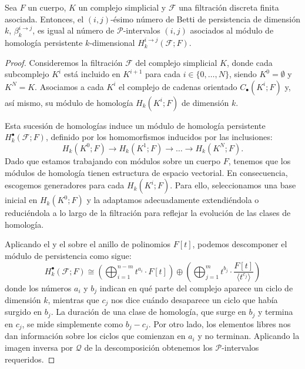 \begin{corolario}
	Sea $F$ un cuerpo, $K$ un complejo simplicial y $\mathcal{F}$ una filtración discreta finita asociada. Entonces, el $(i,j)$-ésimo número de Betti de persistencia de dimensión $k$, \(\beta_k^{i \to j}\), es igual al número de $\mathcal{P}$-intervalos $(i,j)$ asociados al módulo de homología persistente $k$-dimensional  \(H_k^{i \to j}(\mathcal{F};F)\).
\end{corolario}
\begin{proof}
	Consideremos la filtración $\mathcal{F}$ del complejo simplicial $K$, donde cada subcomplejo $K^i$ está incluido en $K^{i+1}$ para cada $i \in \{0, \ldots, N\}$, siendo $K^0=\emptyset$ y $K^N = K$. Asociamos a cada $K^i$ el complejo de cadenas orientado $C_\bullet(K^i; F)$ y, así mismo, su módulo de homología $H_k(K^i; F)$ de dimensión $k$.
	
	Esta sucesión de homologías induce un módulo de homología persistente $H_k^\bullet(\mathcal{F}; F)$, definido por los homomorfismos inducidos por las inclusiones:
	\[
	H_k(K^0; F) \to H_k(K^1; F) \to \dots \to H_k(K^N; F).
	\]
	Dado que estamos trabajando con módulos sobre un cuerpo $F$, tenemos que los módulos de homología tienen estructura de espacio vectorial. En consecuencia, escogemos generadores para cada $H_k(K^i; F)$. Para ello, seleccionamos una base inicial en $H_k(K^0; F)$ y la adaptamos adecuadamente extendiéndola o reduciéndola a lo largo de la filtración para reflejar la evolución de las clases de homología.
	
	Aplicando el  y el  sobre el anillo de polinomios $F[t]$, podemos descomponer el módulo de persistencia como sigue:
	\[
	H_k^\bullet(\mathcal{F}; F) \cong \left( \bigoplus_{i=1}^{n-m} t^{a_i} \cdot F[t] \right) \oplus \left( \bigoplus_{j=1}^m t^{b_j} \cdot \frac{F[t]}{ \langle t^{c_j} \rangle} \right)
	\]
	donde los números \(a_i\) y \(b_j\) indican en qué parte del complejo aparece un ciclo de dimensión \(k\), mientras que \(c_j\) nos dice cuándo desaparece un ciclo que había surgido en \(b_j\). La duración de una clase de homología, que surge en \(b_j\) y termina en \(c_j\), se mide simplemente como \(b_j - c_j\). Por otro lado, los elementos libres nos dan información sobre los ciclos que comienzan en \(a_i\) y no terminan. Aplicando la imagen inversa por $\mathcal{Q}$ de la descomposición obtenemos los $\mathcal{P}$-intervalos requeridos.
%	
\end{proof}
